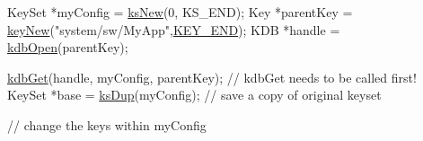 \begin{DoxyCodeInclude}
KeySet *myConfig = \hyperlink{group__keyset_ga671e1aaee3ae9dc13b4834a4ddbd2c3c}{ksNew}(0, KS\_END);
Key *parentKey = \hyperlink{group__key_gad23c65b44bf48d773759e1f9a4d43b89}{keyNew}(\textcolor{stringliteral}{"system/sw/MyApp"},\hyperlink{group__key_gga91fb3178848bd682000958089abbaf40aa8adb6fcb92dec58fb19410eacfdd403}{KEY\_END});
KDB *handle = \hyperlink{group__kdb_ga6808defe5870f328dd17910aacbdc6ca}{kdbOpen}(parentKey);

\hyperlink{group__kdb_ga28e385fd9cb7ccfe0b2f1ed2f62453a1}{kdbGet}(handle, myConfig, parentKey); \textcolor{comment}{// kdbGet needs to be called first!}
KeySet *base = \hyperlink{group__keyset_gac59e4b328245463f1451f68d5106151c}{ksDup}(myConfig); \textcolor{comment}{// save a copy of original keyset}

\textcolor{comment}{// change the keys within myConfig}


\end{DoxyCodeInclude}
